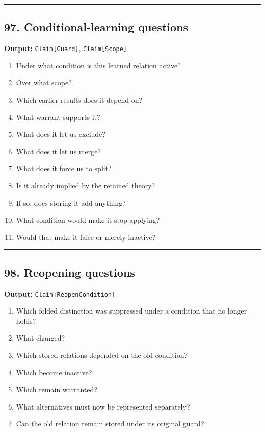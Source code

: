 \documentclass[
]{article}
\providecommand{\tightlist}{%
  \setlength{\itemsep}{0pt}\setlength{\parskip}{0pt}}
\begin{document}
\begin{center}\rule{0.5\linewidth}{0.5pt}\end{center}

\subsection{97. Conditional-learning
questions}\label{conditional-learning-questions}

\textbf{Output:} \texttt{Claim{[}Guard{]}}, \texttt{Claim{[}Scope{]}}

\begin{enumerate}
\def\labelenumi{\arabic{enumi}.}
\tightlist
\item
  Under what condition is this learned relation active?
\item
  Over what scope?
\item
  Which earlier results does it depend on?
\item
  What warrant supports it?
\item
  What does it let us exclude?
\item
  What does it let us merge?
\item
  What does it force us to split?
\item
  Is it already implied by the retained theory?
\item
  If so, does storing it add anything?
\item
  What condition would make it stop applying?
\item
  Would that make it false or merely inactive?
\end{enumerate}

\begin{center}\rule{0.5\linewidth}{0.5pt}\end{center}

\subsection{98. Reopening questions}\label{reopening-questions}

\textbf{Output:} \texttt{Claim{[}ReopenCondition{]}}

\begin{enumerate}
\def\labelenumi{\arabic{enumi}.}
\tightlist
\item
  Which folded distinction was suppressed under a condition that no
  longer holds?
\item
  What changed?
\item
  Which stored relations depended on the old condition?
\item
  Which become inactive?
\item
  Which remain warranted?
\item
  What alternatives must now be represented separately?
\item
  Can the old relation remain stored under its original guard?
\end{enumerate}
\end{document}

